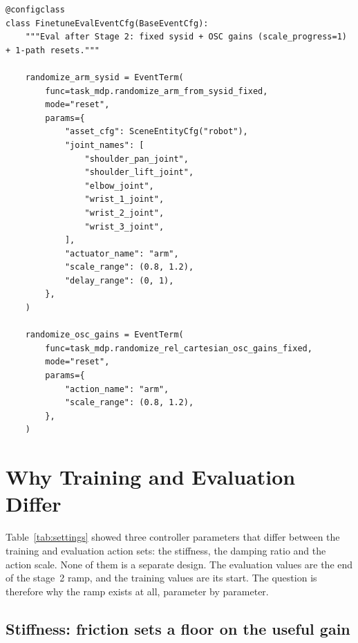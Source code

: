 \begin{snippetbox}[11]
\begin{lstlisting}[firstnumber=274]
@configclass
class FinetuneEvalEventCfg(BaseEventCfg):
    """Eval after Stage 2: fixed sysid + OSC gains (scale_progress=1) + 1-path resets."""

    randomize_arm_sysid = EventTerm(
        func=task_mdp.randomize_arm_from_sysid_fixed,
        mode="reset",
        params={
            "asset_cfg": SceneEntityCfg("robot"),
            "joint_names": [
                "shoulder_pan_joint",
                "shoulder_lift_joint",
                "elbow_joint",
                "wrist_1_joint",
                "wrist_2_joint",
                "wrist_3_joint",
            ],
            "actuator_name": "arm",
            "scale_range": (0.8, 1.2),
            "delay_range": (0, 1),
        },
    )

    randomize_osc_gains = EventTerm(
        func=task_mdp.randomize_rel_cartesian_osc_gains_fixed,
        mode="reset",
        params={
            "action_name": "arm",
            "scale_range": (0.8, 1.2),
        },
    )
\end{lstlisting}
\end{snippetbox}

\section{Why Training and Evaluation Differ}
\label{sec:why}

Table~\ref{tab:settings} showed three controller parameters that differ between the training and evaluation action sets: the stiffness, the damping ratio and the action scale. None of them is a separate design. The evaluation values are the end of the stage~2 ramp, and the training values are its start. The question is therefore why the ramp exists at all, parameter by parameter.

\subsection{Stiffness: friction sets a floor on the useful gain}


